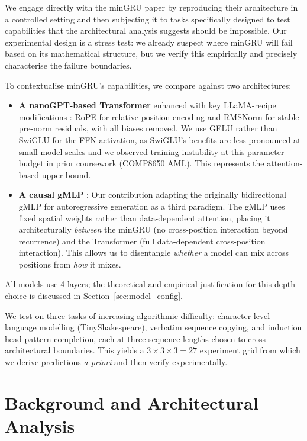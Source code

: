 \documentclass[10pt,a4paper]{article}
\begin{document}
We engage directly with the minGRU paper by reproducing their architecture in a controlled setting and then subjecting it to tasks specifically designed to test capabilities that the architectural analysis suggests should be impossible. Our experimental design is a stress test: we already suspect where minGRU will fail based on its mathematical structure, but we verify this empirically and precisely characterise the failure boundaries.

To contextualise minGRU's capabilities, we compare against two architectures:

\begin{itemize}
    \item \textbf{A nanoGPT-based Transformer} enhanced with key LLaMA-recipe modifications \citep{touvron2023llama}: RoPE \citep{su2024roformer} for relative position encoding and RMSNorm \citep{zhang2019root} for stable pre-norm residuals, with all biases removed. We use GELU rather than SwiGLU for the FFN activation, as SwiGLU's benefits are less pronounced at small model scales and we observed training instability at this parameter budget in prior coursework (COMP8650 AML). This represents the attention-based upper bound.
    \item \textbf{A causal gMLP} \citep{liu2021pay}: Our contribution adapting the originally bidirectional gMLP for autoregressive generation as a third paradigm. The gMLP uses fixed spatial weights rather than data-dependent attention, placing it architecturally \emph{between} the minGRU (no cross-position interaction beyond recurrence) and the Transformer (full data-dependent cross-position interaction). This allows us to disentangle \emph{whether} a model can mix across positions from \emph{how} it mixes.
\end{itemize}

All models use 4 layers; the theoretical and empirical justification for this depth choice is discussed in Section~\ref{sec:model_config}.

We test on three tasks of increasing algorithmic difficulty: character-level language modelling (TinyShakespeare), verbatim sequence copying, and induction head pattern completion, each at three sequence lengths chosen to cross architectural boundaries. This yields a $3 \times 3 \times 3 = 27$ experiment grid from which we derive predictions \emph{a priori} and then verify experimentally.

\section{Background and Architectural Analysis}
\end{document}
